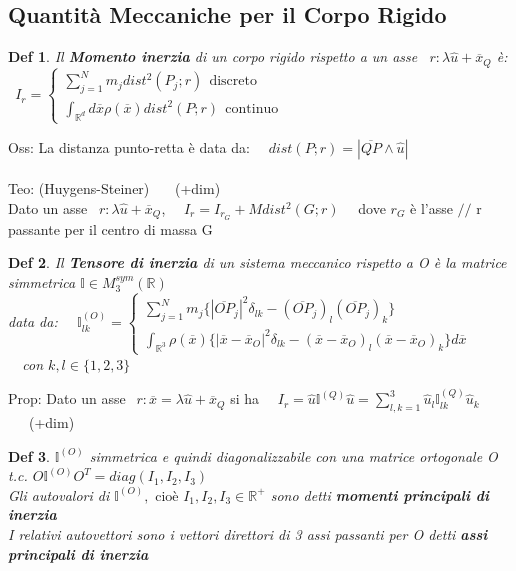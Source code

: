 \documentclass{article}
\theoremstyle{unnumbered}
\newtheorem* {theoremT}{Def}
\theoremstyle{unnumbered1}
\newenvironment{defi}{\begin{gBox}\begin{theoremT}}{\end{theoremT}\end{gBox}}
\begin{document}
\subsection{Quantità Meccaniche per il Corpo Rigido}
%
\begin{defi}
Il \textbf{Momento inerzia} di un corpo rigido rispetto a un asse \ $r: \lambda \hat{u} + \overline{x}_Q$ è:
\ $I_r=\begin{cases}
\sum_{j=1}^N m_j dist^2(P_j;r) \ \ \text{discreto} \\
\int_{\mathbb{R}^d} d\overline{x} \rho (\overline{x}) dist^2(P;r) \ \ \text{continuo}
\end{cases}$
\end{defi}
%
Oss: La distanza punto-retta è data da: \ \ $dist(P;r) = |\overline{QP}\wedge\hat{u}|$ \\ \\
%
%
%
Teo: (Huygens-Steiner)  \ \ \ (+dim) \\
\phantom{\ }Dato un asse \ $r: \lambda \hat{u} + \overline{x}_Q$, \ \ $I_r=I_{r_G} + M dist^2(G;r) $ \ \ dove $r_G$ è l'asse $/\!/$ r passante per il centro di massa G \\
%
%
%
\begin{defi}
Il \textbf{Tensore di inerzia} di un sistema meccanico rispetto a O è la matrice simmetrica $\mathbb{I} \in M_3^{sym}(\mathbb{R})$ \\ \phantom{DEF: } data da: \ \ $\mathbb{I}_{lk}^{(O)}=
\begin{cases}
\sum_{j=1}^N m_j\{|\overline{OP}_j|^2 \delta_{lk} - (\overline{OP}_j)_l(\overline{OP}_j)_k\}\\
\int_{\mathbb{R}^3} \rho(\overline{x}) \{|\overline{x}-\overline{x}_O|^2 \delta_{lk} - (\overline{x}-\overline{x}_O)_l(\overline{x}-\overline{x}_O)_k\}d\overline{x}
\end{cases}$
\ \ con $k,l \in \{1,2,3\}$
\end{defi}
%
%
Prop: Dato un asse $\ \ r: \overline{x}=\lambda\hat{u}+\overline{x}_Q$ si ha \ \ $I_r = \hat{u}\mathbb{I}^{(Q)}\hat{u} = \sum_{l,k=1}^3\hat{u}_l\mathbb{I}^{(Q)}_{lk}\hat{u}_k$ \ \ \ (+dim) \\
%
%
%
\begin{defi}
$\mathbb{I}^{(O)}$ simmetrica e quindi diagonalizzabile con una matrice ortogonale O t.c. $O\mathbb{I}^{(O)}O^T=diag(I_1,I_2,I_3)$\\
%
Gli autovalori di $\mathbb{I}^{(O)}, \text{ cioè } I_1,I_2,I_3 \in \mathbb{R}^+$ sono detti \textbf{momenti principali di inerzia}\\
I relativi autovettori sono i vettori direttori di 3 assi passanti per O detti \textbf{assi principali di inerzia}
\end{defi}
\end{document}

